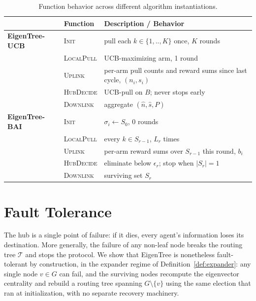 \documentclass[letterpaper]{article} %
\begin{document}
\begin{table}
\caption{Function behavior across different algorithm instantiations.}
\label{tab:instantiations}
\small
\renewcommand{\arraystretch}{1.3} %
\begin{tabularx}{\columnwidth}{llY}
\toprule
& \textbf{Function} & \textbf{Description / Behavior} \\
\midrule
\textbf{EigenTree-UCB} & \textsc{Init} 	    & pull each $k\in\{1,..,K\}$ once, $K$ rounds \\
			       & \textsc{LocalPull}     & UCB-maximizing arm, 1 round \\
                   & \textsc{Uplink}        & per-arm pull counts and reward sums since last cycle, $(n_i,s_i)$ \\
                   & \textsc{HubDecide}     & UCB-pull on $B$; never stops early \\
                   & \textsc{Downlink}      & aggregate $(\hat n,\hat s,P)$ \\
\midrule
\textbf{EigenTree-BAI} & \textsc{Init}   & $\sigma_i \leftarrow S_0$, 0 rounds \\
			       & \textsc{LocalPull}  & every $k\in S_{r-1}$, $L_r$ times \\
                   & \textsc{Uplink}     & per-arm reward sums over $S_{r-1}$ this round, $b_i$ \\
                   & \textsc{HubDecide}  & eliminate below $\epsilon_r$; stop when $|S_r|{=}1$ \\
                   & \textsc{Downlink}   & surviving set $S_r$ \\
\bottomrule
\end{tabularx}
\end{table}


\section{Fault Tolerance}
\label{sec:ft}

The hub is a single point of failure: if it dies, every agent's information
loses its destination. More generally, the failure of any non-leaf node breaks
the routing tree $\mathcal{T}$ and stops the protocol. We show that EigenTree is
nonetheless fault-tolerant by construction, in the expander regime of
Definition~\ref{def:expander}: any single node $v\in G$ can fail, and the
surviving nodes recompute the eigenvector centrality and rebuild a routing tree
spanning $G\setminus\{v\}$ using the same election that ran at initialization,
with no separate recovery machinery.
\end{document}
